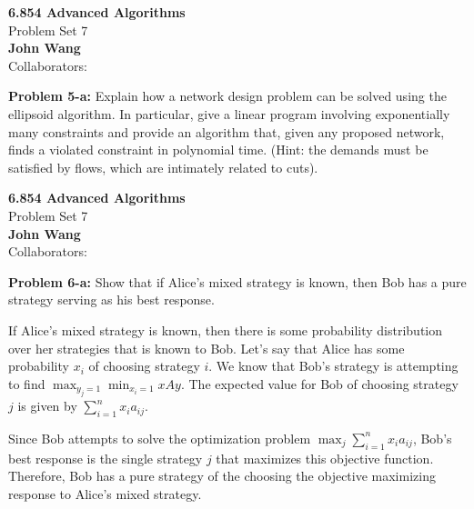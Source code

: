 \documentclass[psamsfonts]{amsart}
\newenvironment{sol}{\vspace{0.25cm}{\large \bfseries Solution:}}{\qedsymbol}
\newenvironment{prob}[1]{\begin{framed}{\large \bfseries Problem #1:}}{\end{framed}}
\newcommand{\makenewtitle}{
    \begin{center}
    {\huge \bfseries 6.854 Advanced Algorithms} \\
    Problem Set 7\\
    \vspace{0.25cm}
    {\bfseries John Wang} \\
    Collaborators: 
    \end{center}
    \vspace{0.5cm}
}
\begin{document}
\newpage
\makenewtitle

\begin{prob}{5-a}
Explain how a network design problem can be solved using the ellipsoid algorithm. In particular, give a linear program involving exponentially many constraints and provide an algorithm that, given any proposed network, finds a violated constraint in polynomial time. (Hint: the demands must be satisfied by flows, which are intimately related to cuts).
\end{prob}
\begin{sol}
\end{sol}

\newpage
\makenewtitle

\begin{prob}{6-a}
Show that if Alice's mixed strategy is known, then Bob has a pure strategy serving as his best response.
\end{prob}
\begin{sol}
If Alice's mixed strategy is known, then there is some probability distribution over her strategies that is known to Bob. Let's say that Alice has some probability $x_i$ of choosing strategy $i$. We know that Bob's strategy is attempting to find $\max_{y_j = 1} \min_{x_i = 1} xAy$. The expected value for Bob of choosing strategy $j$ is given by $\sum_{i=1}^n x_i a_{ij}$. 

Since Bob attempts to solve the optimization problem $\max_{j} \sum_{i=1}^n x_i a_{ij}$, Bob's best response is the single strategy $j$ that maximizes this objective function. Therefore, Bob has a pure strategy of the choosing the objective maximizing response to Alice's mixed strategy.
\end{sol}
\end{document}
